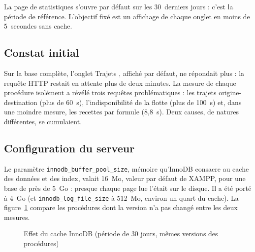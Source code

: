 La page de statistiques s'ouvre par défaut sur les 30~derniers jours : c'est la période de référence. L'objectif fixé est un affichage de chaque onglet en moins de 5~secondes sans cache.

\subsection{Constat initial}

Sur la base complète, l'onglet \og Trajets \fg{}, affiché par défaut, ne répondait plus : la requête HTTP restait en attente plus de deux minutes. La mesure de chaque procédure isolément a révélé trois requêtes problématiques : les trajets origine-destination (plus de 60~s), l'indisponibilité de la flotte (plus de 100~s) et, dans une moindre mesure, les recettes par formule (8,8~s). Deux causes, de natures différentes, se cumulaient.

\subsection{Configuration du serveur}

Le paramètre \texttt{innodb\_buffer\_pool\_size}, mémoire qu'InnoDB consacre au cache des données et des index, valait 16~Mo, valeur par défaut de XAMPP, pour une base de près de 5~Go : presque chaque page lue l'était sur le disque. Il a été porté à 4~Go (et \texttt{innodb\_log\_file\_size} à 512~Mo, environ un quart du cache). La figure~\ref{fig:pool} compare les procédures dont la version n'a pas changé entre les deux mesures.

\begin{figure}[htbp]\centering
{}
\caption{Effet du cache InnoDB (période de 30 jours, mêmes versions des procédures)}\label{fig:pool}
\end{figure}


